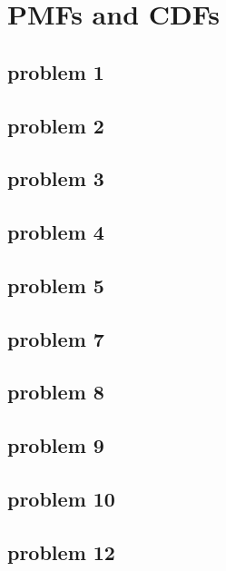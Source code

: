 \section{PMFs and CDFs}

\subsection{problem 1}


\subsection{problem 2}


\subsection{problem 3}


\subsection{problem 4}


\subsection{problem 5}


\subsection{problem 7}


\subsection{problem 8}


\subsection{problem 9}


\subsection{problem 10}


\subsection{problem 12}
